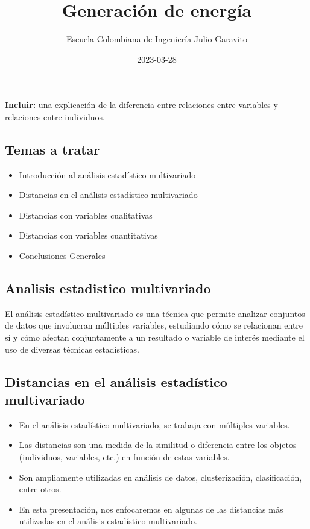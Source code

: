 \documentclass[
]{article}
\title{Generación de energía}
\author{Escuela Colombiana de Ingeniería Julio Garavito}
\date{2023-03-28}
\providecommand{\tightlist}{%
  \setlength{\itemsep}{0pt}\setlength{\parskip}{0pt}}
\begin{document}
\maketitle

\textbf{Incluir:} una explicación de la diferencia entre relaciones
entre variables y relaciones entre individuos.

\hypertarget{temas-a-tratar}{%
\subsection{Temas a tratar}\label{temas-a-tratar}}

\begin{itemize}
\item
  Introducción al análisis estadístico multivariado
\item
  Distancias en el análisis estadístico multivariado
\item
  Distancias con variables cualitativas
\item
  Distancias con variables cuantitativas
\item
  Conclusiones Generales
\end{itemize}

\hypertarget{analisis-estadistico-multivariado}{%
\subsection{Analisis estadistico
multivariado}\label{analisis-estadistico-multivariado}}

El análisis estadístico multivariado es una técnica que permite analizar
conjuntos de datos que involucran múltiples variables, estudiando cómo
se relacionan entre sí y cómo afectan conjuntamente a un resultado o
variable de interés mediante el uso de diversas técnicas estadísticas.

\hypertarget{distancias-en-el-anuxe1lisis-estaduxedstico-multivariado}{%
\subsection{Distancias en el análisis estadístico
multivariado}\label{distancias-en-el-anuxe1lisis-estaduxedstico-multivariado}}

\begin{itemize}
\tightlist
\item
  En el análisis estadístico multivariado, se trabaja con múltiples
  variables.
\item
  Las distancias son una medida de la similitud o diferencia entre los
  objetos (individuos, variables, etc.) en función de estas variables.
\item
  Son ampliamente utilizadas en análisis de datos, clusterización,
  clasificación, entre otros.
\item
  En esta presentación, nos enfocaremos en algunas de las distancias más
  utilizadas en el análisis estadístico multivariado.
\end{itemize}
\end{document}
